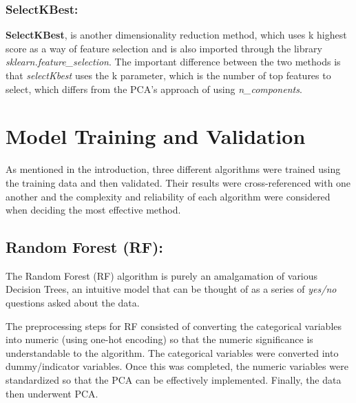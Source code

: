 \documentclass{article}
\begin{document}
\subsubsection{SelectKBest\cite{SelectKBest}:}
\textbf{SelectKBest}, is another dimensionality reduction method, which uses k highest score as a way of feature selection and is also imported through the library \textit{sklearn.feature\_selection}. The important difference between the two methods is that \textit{selectKbest} uses the k parameter, which is the number of top features to select, which differs from the PCA’s approach of using \textit{n\_components}. 

\section{Model Training and Validation}
As mentioned in the introduction, three different algorithms were trained using the training data and then validated. Their results were cross-referenced with one another and the complexity and reliability of each algorithm were considered when deciding the most effective method.
\subsection{Random Forest (RF):}
The Random Forest (RF) algorithm is purely an amalgamation of various Decision Trees\cite{h2o}, an intuitive model that can be thought of as a series of \textit{yes/no} questions asked about the data.

The preprocessing steps for RF consisted of converting the categorical variables into numeric (using one-hot encoding) so that the numeric significance is understandable to the algorithm. The categorical variables were converted into dummy/indicator variables. Once this was completed, the numeric variables were standardized so that the PCA can be effectively implemented. Finally, the data then underwent PCA. 
\end{document}
